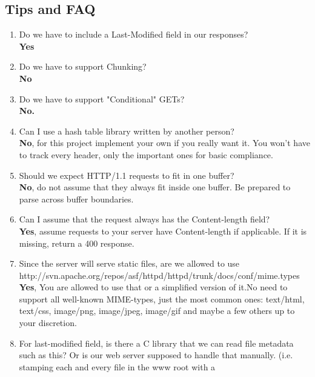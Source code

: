 \subsection{Tips and FAQ}
\begin{enumerate}
  \item Do we have to include a Last-Modified field in our responses?\\
    \textbf{Yes}
    \item Do we have to support Chunking?\\
    \textbf{No}
    \item Do we have to support "Conditional" GETs?\\
    \textbf{No.}
    \item Can I use a hash table library written by another person?\\
    \textbf{No}, for this project implement your own if you really want it. You won't have to track every header, only the important ones for basic compliance.
    \item Should we expect HTTP/1.1 requests to fit in one buffer?\\
    \textbf{No}, do not assume that they always fit inside one buffer. Be prepared to parse across buffer boundaries.
    \item Can I assume that the request always has the Content-length field?\\
    \textbf{Yes}, assume requests to your server have Content-length if applicable. If it is missing, return a 400 response.
    \item Since the server will serve static files, are we allowed to use http://svn.apache.org/repos/asf/httpd/httpd/trunk/docs/conf/mime.types\\
    \textbf{Yes}, You are allowed to use that or a simplified version of it.No need to support all well-known MIME-types, just the most common ones: text/html, text/css, image/png, image/jpeg, image/gif and maybe a few others up to your discretion.
    \item For last-modified field, is there a C library that we can read file
     metadata  such as this? Or is our web server supposed to handle that
     manually. (i.e. stamping each and every file in the www root with a

\end{enumerate}
